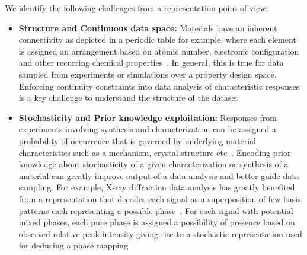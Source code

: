 We identify the following challenges from a representation point of view:
\begin{itemize}
    \item {\textbf{Structure and Continuous data space: }Materials have an inherent connectivity as depicted in a periodic table for example, where each element is assigned an arrangement based on atomic number, electronic configuration and other recurring chemical properties~\cite{periodictable}. In general, this is true for data sampled from experiments or simulations over a property design space. Enforcing continuity constraints into data analysis of characteristic responses is a key challenge to understand the structure of the dataset~\cite{lebras2011constraint}}
    \item {\textbf{Stochasticity and Prior knowledge exploitation:} Responses from experiments involving synthesis and characterization can be assigned a probability of occurrence that is governed by underlying material characteristics such as a mechanism, crystal structure etc~\cite{hull2018stochasticity}. Encoding prior knowledge about stochasticity of a given characterization or synthesis of a material can greatly improve output of a data analysis and better guide data sampling.  For example, X-ray diffraction data analysis has greatly benefited from a representation that decodes each signal as a superposition of few basis patterns each representing a possible phase~\cite{Kusne2015HighthroughputDO,hattrick2016perspective}. For each signal with potential mixed phases, each pure phase is assigned a possibility of presence based on observed relative peak intensity giving rise to a stochastic representation used for deducing a phase mapping~\cite{gomes2019crystal,stanev2018unsupervised}}
\end{itemize}


